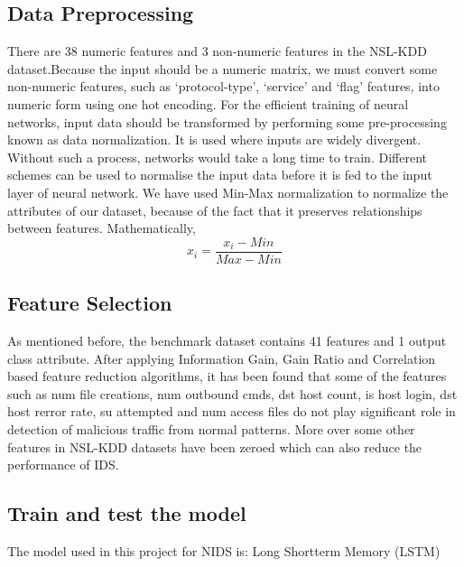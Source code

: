 \subsection{Data Preprocessing}
\vspace{-18pt}
There are 38 numeric features and 3 non-numeric features in the NSL-KDD dataset.Because the input should be a numeric matrix, we must convert some non-numeric features, such as ‘protocol-type’, ‘service’ and ‘flag’ features, into numeric form using one hot encoding. For the efficient training of neural networks, input data should be transformed by performing some pre-processing known as data normalization. It is used where inputs are widely divergent. Without such a process, networks would take a long time to train. Different schemes can be used to normalise the input data before it is fed to the input layer of neural network. We have used Min-Max normalization to normalize the attributes of our dataset, because of the fact that it preserves relationships between features. Mathematically,
\begin{equation}
x_{i} = \frac{x_{i}- Min}{Max - Min}
\end{equation}
\subsection{Feature Selection}
As mentioned before, the benchmark dataset contains 41 features and 1 output class attribute. After applying Information Gain, Gain Ratio and Correlation based feature reduction algorithms, it has been found that some of the features such as num file creations, num outbound cmds, dst host count, is host login, dst host rerror rate, su attempted and num access files do not play significant role in detection of malicious traffic from normal patterns. More over some other features in NSL-KDD datasets have been zeroed which can also reduce the performance of IDS.
\subsection{Train and test the model}
\vspace{-18pt}
The model used in this project for NIDS is: Long Shortterm Memory (LSTM)
\par 

